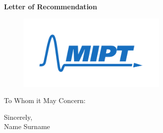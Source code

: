 \documentclass{letter}
\date{}
\begin{document}
\begin{letter}
{
\centering \Large \textbf{Letter of Recommendation}
}

\hfill
\begin{figure}%
    \centering
    \includegraphics[width=0.65\textwidth]{eng.pdf}
\end{figure}

\opening{To Whom it May Concern:} %
\medskip 

\lipsum[1-5]

\medskip
Sincerely, \\
Name Surname \\

\end{letter}
\end{document}
